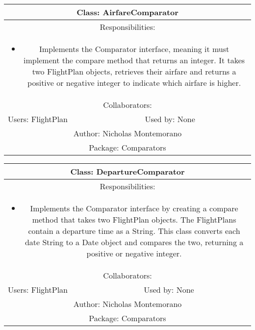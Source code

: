 \begin{center}
    \begin{tabular}{ |p{7cm}|p{7cm}|  }
        \hline
        \multicolumn{2}{|c|}{Class: AirfareComparator} \\
        \hline
        \multicolumn{2}{|c|}{Responsibilities:} \\ \multicolumn{2}{|c|}{\parbox{0.9\textwidth}{
        \begin{itemize}
            \item Implements the Comparator interface, meaning it must implement the compare method that returns an integer. It takes two FlightPlan objects, retrieves their airfare and returns a positive or negative integer to indicate which airfare is higher.
        \end{itemize} }} \\
        \hline
        \multicolumn{2}{|c|}{Collaborators:} \\
        \hline
        Users: FlightPlan & Used by: None \\
        \hline
        \multicolumn{2}{|c|}{Author: Nicholas Montemorano} \\
        \hline
        \multicolumn{2}{|c|}{Package: Comparators} \\
        \hline
    \end{tabular}
\end{center}

\begin{center}
    \begin{tabular}{ |p{7cm}|p{7cm}|  }
        \hline
        \multicolumn{2}{|c|}{Class: DepartureComparator} \\
        \hline
        \multicolumn{2}{|c|}{Responsibilities:} \\ \multicolumn{2}{|c|}{\parbox{0.9\textwidth}{
        \begin{itemize}
            \item Implements the Comparator interface by creating a compare method that takes two FlightPlan objects. The FlightPlans contain a departure time as a String. This class converts each date String to a Date object and compares the two, returning a positive or negative integer.
        \end{itemize} }} \\
        \hline
        \multicolumn{2}{|c|}{Collaborators:} \\
        \hline
        Users: FlightPlan & Used by: None \\
        \hline
        \multicolumn{2}{|c|}{Author: Nicholas Montemorano} \\
        \hline
        \multicolumn{2}{|c|}{Package: Comparators} \\
        \hline
    \end{tabular}
\end{center}

